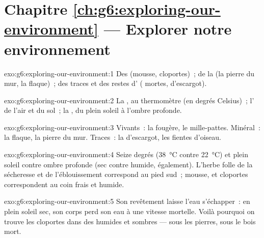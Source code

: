 \section*{Chapitre \ref{ch:g6:exploring-our-environment} --- Explorer notre environnement}

\begin{solution}{exo:g6:exploring-our-environment:1}
Des  (mousse, cloportes)~; de la  (la
pierre du mur, la flaque)~; des traces et des restes d'
( mortes,  d'escargot).
\end{solution}

\begin{solution}{exo:g6:exploring-our-environment:2}
La , au thermomètre (en degrés Celsius)~; l' de
l'air et du sol~; la , du plein soleil à l'ombre profonde.
\end{solution}

\begin{solution}{exo:g6:exploring-our-environment:3}
Vivants~: la fougère, le mille-pattes. Minéral~: la flaque, la
pierre du mur. Traces~: la  d'escargot, les fientes
d'oiseau.
\end{solution}

\begin{solution}{exo:g6:exploring-our-environment:4}
Seize degrés (\qty{38}{\degreeCelsius} contre
\qty{22}{\degreeCelsius}) et plein soleil contre ombre profonde (sec
contre humide, également). L'herbe folle de la sécheresse et de
l'éblouissement correspond au pied sud~; mousse,  et
cloportes correspondent au coin frais et humide.
\end{solution}

\begin{solution}{exo:g6:exploring-our-environment:5}
Son revêtement laisse l'eau s'échapper~: en plein soleil sec, son
corps perd son eau à une vitesse mortelle. Voilà pourquoi on trouve
les cloportes dans des  humides et sombres --- sous
les pierres, sous le bois mort.
\end{solution}

